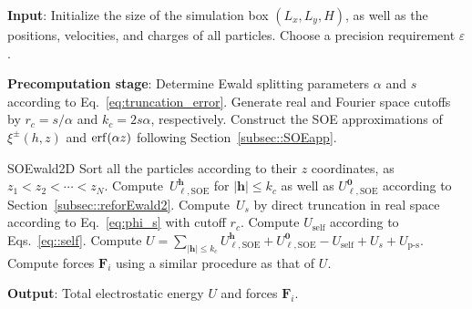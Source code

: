 \begin{algorithm}[ht] 
	\caption{The sum-of-exponentials Ewald2D method}
	\begin{algorithmic}[1]
		\State \textbf{Input}: Initialize the size of the simulation box $(L_x, L_y, H)$, as well as the positions, velocities, and charges of all particles. Choose a precision requirement $\varepsilon$.  %
		
		\State \textbf{Precomputation stage}: Determine Ewald splitting parameters $\alpha$ and $s$ according to Eq.~\eqref{eq:truncation_error}. Generate real and Fourier space cutoffs by $r_c=s/\alpha$ and $k_c=2s\alpha$, respectively. Construct the SOE approximations of $\xi^{\pm}(h,z)$ and $\operatorname{erf}(\alpha z)$ following Section~\ref{subsec::SOEapp}.
		
		\Procedure\textnormal{SOEwald2D}{}   
		\State Sort all the particles according to their $z$ coordinates, as $z_1 < z_2 < \cdots < z_N$.
		\State Compute~$U_{\ell,\text{SOE}}^{\bm{h}}$ for $|\bm{h}|\leq k_c$ as well as $U_{\ell,\text{SOE}}^{\bm{0}}$ according to Section~\ref{subsec::reforEwald2}. 
		\State Compute~$U_{s}$ by direct truncation in real space according to Eq.~\eqref{eq:phi_s} with cutoff $r_c$. %
		\State Compute $U_{\text{self}}$ according to Eqs.~\eqref{eq::self}.
		\State Compute $U = \sum_{|\bm{h}|\leq k_c} U_{\ell, \text{SOE}}^{\bm{h}} + U_{\ell,\text{SOE}}^{\bm{0}} - U_{\text{self}} + U_{s} + U_{\text{p-s}}$.
		\State Compute forces $\bm{F}_{i}$ using a similar procedure as that of $U$.
		\EndProcedure
		
		\State \textbf{Output}: Total electrostatic energy $U$ and forces $\bm{F}_{i}$.
		
	\end{algorithmic}\label{alg:SOEwald2D}
\end{algorithm}

